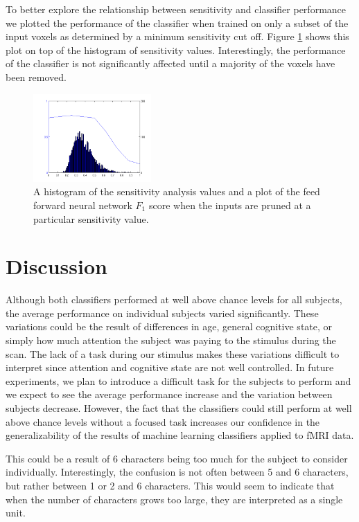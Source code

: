 \documentclass[preprint,5p,authoryear]{elsarticle}
\begin{document}
To better explore the relationship between sensitivity and classifier performance we plotted the performance of the classifier when trained on only a subset of the input voxels as determined by a minimum sensitivity cut off.
Figure \ref{fig:sensitivity-cutoff} shows this plot on top of the histogram of sensitivity values.
Interestingly, the performance of the classifier is not significantly affected until a majority of the voxels have been removed.


\begin{figure}
\centering
\includegraphics[width=0.4\textwidth]{figures/sensitivity-cutoff}
\caption{A histogram of the sensitivity analysis values and a plot of the feed forward neural network $F_1$ score when the inputs are pruned at a particular sensitivity value. }
\label{fig:sensitivity-cutoff}
\end{figure}

\section{Discussion}
Although both classifiers performed at well above chance levels for all subjects, the average performance on individual subjects varied significantly.
These variations could be the result of differences in age, general cognitive state, or simply how much attention the subject was paying to the stimulus during the scan.
The lack of a task during our stimulus makes these variations difficult to interpret since attention and cognitive state are not well controlled.
In future experiments, we plan to introduce a difficult task for the subjects to perform and we expect to see the average performance increase and the variation between subjects decrease.
However, the fact that the classifiers could still perform at well above chance levels without a focused task increases our confidence in the generalizability of the results of machine learning classifiers applied to fMRI data.


This could be a result of 6 characters being too much for the subject to consider individually.
Interestingly, the confusion is not often between 5 and 6 characters, but rather between 1 or 2 and 6 characters.
This would seem to indicate that when the number of characters grows too large, they are interpreted as a single unit.
\end{document}

